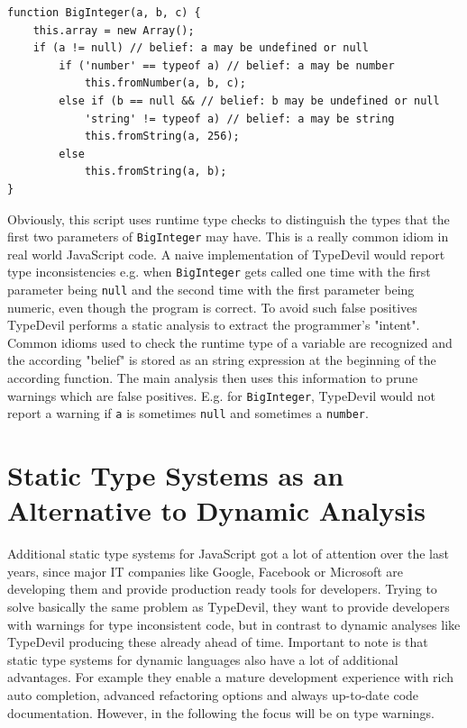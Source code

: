 \documentclass[runningheads,a4paper]{llncs}
\begin{document}
\medskip\medskip
\lstset{language=javascript}
\begin{minipage}{\linewidth}
\begin{lstlisting}[frame=single, caption=Pruning via Belief Analysis, label={lst:BeliefAnalysis}]
function BigInteger(a, b, c) { 
    this.array = new Array();
    if (a != null) // belief: a may be undefined or null
        if ('number' == typeof a) // belief: a may be number
            this.fromNumber(a, b, c);
        else if (b == null && // belief: b may be undefined or null
            'string' != typeof a) // belief: a may be string
            this.fromString(a, 256); 
        else  
            this.fromString(a, b);
}
\end{lstlisting}
\end{minipage}

Obviously, this script uses runtime type checks to distinguish the types that the first two parameters of \lstinline[columns=fixed]{BigInteger} may have.
This is a really common idiom in real world JavaScript code.
A naive implementation of TypeDevil would report type inconsistencies e.g. when \lstinline[columns=fixed]{BigInteger} gets called one time with the first parameter being \lstinline[columns=fixed]{null} and the second time with the first parameter being numeric, even though the program is correct. 
To avoid such false positives TypeDevil performs a static analysis to extract the programmer’s "intent".
Common idioms used to check the runtime type of a variable are recognized and the according "belief" is stored as an string expression at the beginning of the according function.
The main analysis then uses this information to prune warnings which are false positives.
E.g. for \lstinline[columns=fixed]{BigInteger}, TypeDevil would not report a warning if \lstinline[columns=fixed]{a} is sometimes \lstinline[columns=fixed]{null} and sometimes a \lstinline[columns=fixed]{number}.

\section{Static Type Systems as an Alternative to Dynamic Analysis}

Additional static type systems for JavaScript got a lot of attention over the last years, since major IT companies like Google, Facebook or Microsoft are developing them and provide production ready tools for developers.
Trying to solve basically the same problem as TypeDevil, they want to provide developers with warnings for type inconsistent code, but in contrast to dynamic analyses like TypeDevil producing these already ahead of time.
Important to note is that static type systems for dynamic languages also have a lot of additional advantages.
For example they enable a mature development experience with rich auto completion, advanced refactoring options and always up-to-date code documentation.
However, in the following the focus will be on type warnings.
\end{document}
